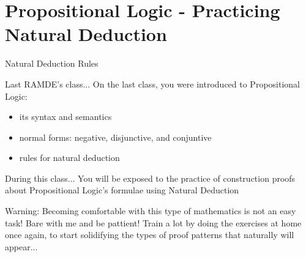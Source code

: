 \documentclass[aspectratio=169]{beamer}
\begin{document}
\frame[plain]{\titlepage}


\section{Propositional Logic - Practicing Natural Deduction}

\begin{slide}{Natural Deduction Rules}
\small

\begin{block}{Last RAMDE's class...}
  On the last class, you were introduced to Propositional Logic:
  \begin{itemize}
    \item its syntax and semantics
    \item normal forms: negative, disjunctive, and conjuntive
    \item rules for natural deduction
  \end{itemize}
\end{block}

\begin{block}{During this class...}
You will be exposed to the practice of construction proofs about Propositional Logic's formulae using Natural Deduction  
\end{block}


\begin{alert}{Warning:}
Becoming comfortable with this type of mathematics is not an easy task! Bare with me and be pattient! Train a lot by doing the exercises at home once again, to start solidifying the types of proof patterns that naturally will appear...
\end{alert}

\end{slide}
\end{document}
